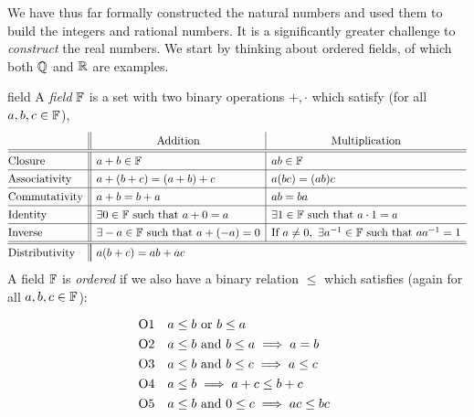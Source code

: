 We have thus far formally constructed the natural numbers and used them to build the integers and rational numbers. It is a significantly greater challenge to \emph{construct} the real numbers. We start by thinking about ordered fields, of which both $\mathbb{Q}$ and $\mathbb{R}$ are examples.

\begin{axioms}{}{field}
	A \emph{field} $\mathbb{F}$ is a set with two binary operations $+,\cdot$ which satisfy (for all $a,b,c\in\mathbb{F}$),\footnotemark
	\[
		\def\arraystretch{1.3}
		\begin{array}{@{}l||l|l}
			&\multicolumn{1}{c|}{\text{Addition}}
			&
			\multicolumn{1}{c}{\text{Multiplication}}\\\hline\hline
			\text{Closure}&a+b\in\F &ab\in\F\\\hline
			\text{Associativity}&a+(b+c)=(a+b)+c &a(bc)=(ab)c\\\hline
			\text{Commutativity}&a+b=b+a &ab=ba\\\hline
			\text{Identity}&\exists 0\in\F\text{ such that }a+0=a &\exists 1\in\F \text{ such that }a\cdot 1=a\\\hline
			\text{Inverse}&\exists -a\in\F \text{ such that }a+(-a)=0 &\text{If }a\neq 0,\ \exists a^{-1}\in\F\text{ such that }aa^{-1}=1\\\hline\hline
			\text{Distributivity}&\multicolumn{2}{|l}{a(b+c)=ab+ac}%
		\end{array}
	\]
	A field $\mathbb{F}$ is \emph{ordered} if we also have a binary relation $\le$ which satisfies (again for all $a,b,c\in\mathbb{F}$):
	\[
		\def\arraystretch{1.3}
		\begin{array}{@{}ll}
			\text{O1}&a\le b\text{ or }b\le a\\
			\text{O2}&a\le b\text{ and }b\le a\implies a=b\\
			\text{O3}&a\le b\text{ and }b\le c\implies a\le c\\
			\text{O4}&a\le b\implies a+c\le b+c\\
			\text{O5}&a\le b\text{ and }0\le c\implies ac\le bc
		\end{array}
	\]
\end{axioms}


